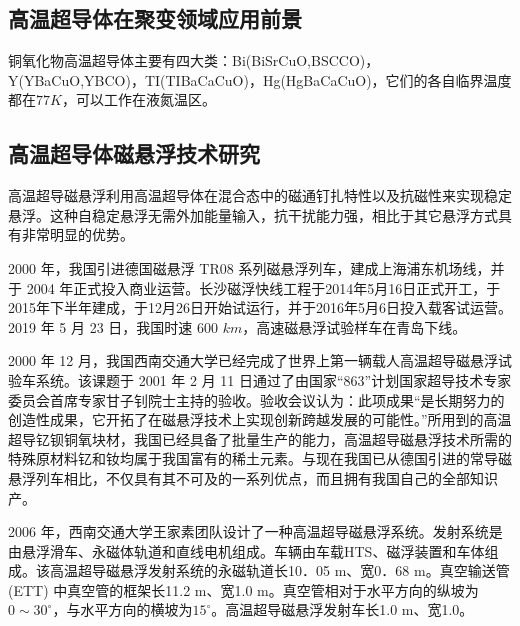 \documentclass[UTF8, twocolumn]{ctexart}
\begin{document}
    \subsection{高温超导体在聚变领域应用前景}

    铜氧化物高温超导体主要有四大类：Bi(BiSrCuO,BSCCO)，Y(YBaCuO,YBCO)，TI(TIBaCaCuO)，Hg(HgBaCaCuO)，它们的各自临界温度都在$77K$，可以工作在液氮温区。\cite{孙林煜2012第二代高温超导体研究与在聚变领域应用前景}


    \subsection{高温超导体磁悬浮技术研究}
    高温超导磁悬浮利用高温超导体在混合态中的磁通钉扎特性以及抗磁性来实现稳定悬浮。这种自稳定悬浮无需外加能量输入，抗干扰能力强，相比于其它悬浮方式具有非常明显的优势。\cite{刘文旭2020高温超导磁悬浮技术研究论述}

    2000 年，我国引进德国磁悬浮 TR08 系列磁悬浮列车，建成上海浦东机场线，并于 2004 年正式投入商业运营\cite{1643050}。长沙磁浮快线工程于2014年5月16日正式开工，于2015年下半年建成，于12月26日开始试运行，并于2016年5月6日投入载客试运营。2019 年 5 月 23 日，我国时速 600 $km$，高速磁悬浮试验样车在青岛下线。

    2000 年 12 月，我国西南交通大学已经完成了世界上第一辆载人高温超导磁悬浮试验车系统。该课题于 2001 年 2 月 11 日通过了由国家“863”计划国家超导技术专家委员会首席专家甘子钊院士主持的验收。验收会议认为：此项成果“是长期努力的创造性成果，它开拓了在磁悬浮技术上实现创新跨越发展的可能性。”所用到的高温超导钇钡铜氧块材，我国已经具备了批量生产的能力，高温超导磁悬浮技术所需的特殊原材料钇和钕均属于我国富有的稀土元素。与现在我国已从德国引进的常导磁悬浮列车相比，不仅具有其不可及的一系列优点，而且拥有我国自己的全部知识产。\cite{沈志云2012在我国建设世界上第一条高温超导磁悬浮列车试运行线的建议}

    2006 年，西南交通大学王家素团队设计了一种高温超导磁悬浮系统。发射系统是由悬浮滑车、永磁体轨道和直线电机组成。车辆由车载HTS、磁浮装置和车体组成。该高温超导磁悬浮发射系统的永磁轨道长10．05 m、宽0．68 m。真空输送管(ETT) 中真空管的框架长11.2 m、宽1.0 m。真空管相对于水平方向的纵坡为$0\sim 30^\circ$，与水平方向的横坡为$15^\circ$。高温超导磁悬浮发射车长1.0 m、宽1.0。\cite{pan2011influence}
\end{document}
